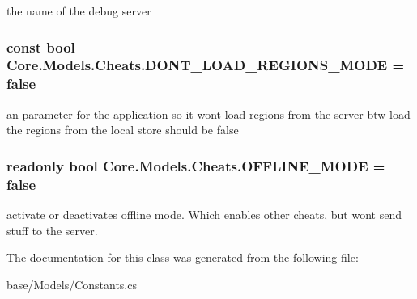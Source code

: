 the name of the debug server 

\hypertarget{classCore_1_1Models_1_1Cheats_a78e94d06892c42586bbae6e081389547}{}
\subsubsection[{D\+O\+N\+T\+\_\+\+L\+O\+A\+D\+\_\+\+R\+E\+G\+I\+O\+N\+S\+\_\+\+M\+O\+D\+E}]{\setlength{\rightskip}{0pt plus 5cm}const bool Core.\+Models.\+Cheats.\+D\+O\+N\+T\+\_\+\+L\+O\+A\+D\+\_\+\+R\+E\+G\+I\+O\+N\+S\+\_\+\+M\+O\+D\+E = false}\label{classCore_1_1Models_1_1Cheats_a78e94d06892c42586bbae6e081389547}


an parameter for the application so it won\textquotesingle{}t load regions from the server btw load the regions from the local store should be false 

\hypertarget{classCore_1_1Models_1_1Cheats_a3010379c1c4ec330e482faed9f73bea8}{}
\subsubsection[{O\+F\+F\+L\+I\+N\+E\+\_\+\+M\+O\+D\+E}]{\setlength{\rightskip}{0pt plus 5cm}readonly bool Core.\+Models.\+Cheats.\+O\+F\+F\+L\+I\+N\+E\+\_\+\+M\+O\+D\+E = false\hspace{0.3cm}{\ttfamily [static]}}\label{classCore_1_1Models_1_1Cheats_a3010379c1c4ec330e482faed9f73bea8}


activate or deactivates offline mode. Which enables other cheats, but won\textquotesingle{}t send stuff to the server. 



The documentation for this class was generated from the following file\+:\begin{DoxyCompactItemize}
\item 
base/\+Models/Constants.\+cs\end{DoxyCompactItemize}
